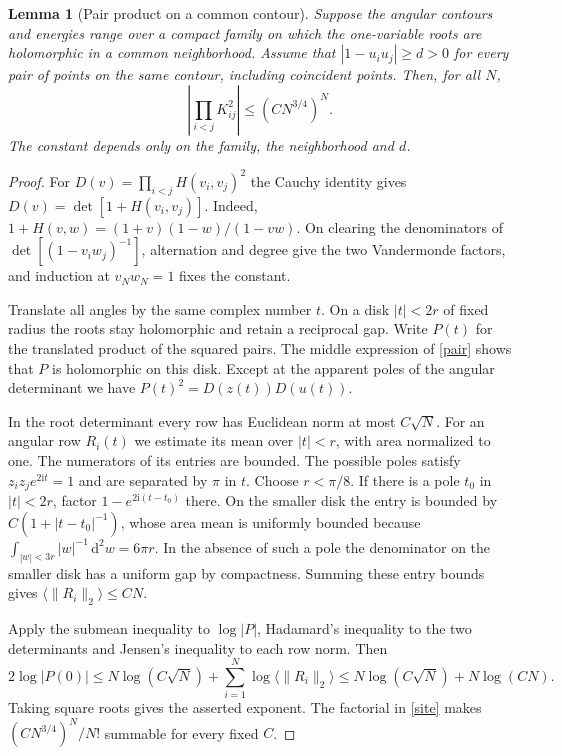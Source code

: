 \documentclass[11pt]{article}
\newtheorem{lemma}{Lemma}
\newcommand{\ii}{\mathrm i}
\newcommand{\dd}{\,\mathrm d}
\begin{document}
\begin{lemma}[Pair product on a common contour]\label{lem:pair-bound}
Suppose the angular contours and energies range over a compact family
on which the one-variable roots are holomorphic in a common neighborhood.
Assume that $|1-u_i u_j|\ge d>0$ for every pair of points on the same
contour, including coincident points. Then, for all $N$,
\[
 \left|\prod_{i<j}K_{ij}^2\right|\le (C N^{3/4})^N .
\]
The constant depends only on the family, the neighborhood and $d$.
\end{lemma}
\begin{proof}
For $D(v)=\prod_{i<j}H(v_i,v_j)^2$ the Cauchy identity gives
$D(v)=\det[1+H(v_i,v_j)]$. Indeed,
$1+H(v,w)=(1+v)(1-w)/(1-vw)$. On clearing the denominators of
$\det[(1-v_iw_j)^{-1}]$, alternation and degree give the two
Vandermonde factors, and induction at $v_Nw_N=1$ fixes the constant.

Translate all angles by the same complex number $t$. On a disk
$|t|<2r$ of fixed radius the roots stay holomorphic and retain a
reciprocal gap. Write $P(t)$ for the translated product of the squared
pairs. The middle expression of \eqref{pair} shows that $P$ is
holomorphic on this disk. Except at the apparent poles of the angular
determinant we have $P(t)^2=D(z(t))D(u(t))$.

In the root determinant every row has Euclidean norm at most $C\sqrt N$.
For an angular row $R_i(t)$ we estimate its mean over $|t|<r$,
with area normalized to one. The numerators of its entries are bounded.
The possible poles satisfy $z_i z_j e^{2\ii t}=1$ and are separated by
$\pi$ in $t$. Choose $r<\pi/8$. If there is a pole $t_0$ in $|t|<2r$,
factor $1-e^{2\ii(t-t_0)}$ there. On the smaller disk the entry is
bounded by $C(1+|t-t_0|^{-1})$, whose area mean is uniformly bounded
because $\int_{|w|<3r}|w|^{-1}\dd^2w=6\pi r$. In the absence of such
a pole the denominator on the smaller disk has a uniform gap by
compactness. Summing these entry bounds gives
$\langle\|R_i\|_2\rangle\le CN$.

Apply the submean inequality to $\log|P|$, Hadamard's inequality to
the two determinants and Jensen's inequality to each row norm. Then
\[
  2\log|P(0)|
   \le N\log(C\sqrt N)+\sum_{i=1}^N\log\langle\|R_i\|_2\rangle
   \le N\log(C\sqrt N)+N\log(CN).
\]
Taking square roots gives the asserted exponent. The factorial in
\eqref{site} makes $(CN^{3/4})^N/N!$ summable for every fixed $C$.
\end{proof}
\end{document}
